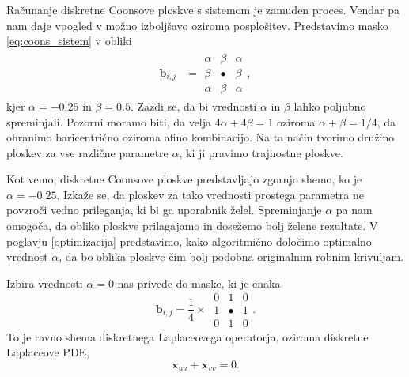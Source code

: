 \documentclass[twocolumn, 10pt]{article}    %
\begin{document}
Računanje diskretne Coonsove ploskve s sistemom je zamuden proces.
Vendar pa nam daje vpogled v možno izboljšavo oziroma posplošitev.
Predstavimo masko \ref{eq:coons_sistem} v obliki
\begin{align}
    \mathbf{b}_{i,j} &= 
    \begin{matrix}
        \alpha & \beta & \alpha \\
        \beta &  \bullet &  \beta \\
        \alpha& \beta & \alpha
    \end{matrix},
    \label{eq:permanence_sistem}
\end{align}
kjer $\alpha = -0.25$ in $\beta = 0.5$.
Zazdi se, da bi vrednosti $\alpha$ in $\beta$ lahko poljubno spreminjali.
Pozorni moramo biti, da velja $4\alpha + 4\beta = 1$ oziroma $\alpha + \beta = 1/4$, da ohranimo baricentrično oziroma afino kombinacijo.
Na ta način tvorimo družino ploskev za vse različne parametre $\alpha$, ki ji pravimo trajnostne ploskve.

Kot vemo, diskretne Coonsove ploskve predstavljajo zgornjo shemo, ko je $\alpha = -0.25.$
Izkaže se, da ploskev za tako vrednosti prostega parametra ne povzroči vedno prileganja, ki bi ga uporabnik želel.
Spreminjanje $\alpha$ pa nam omogoča, da obliko ploskve prilagajamo in dosežemo bolj želene rezultate. 
V poglavju \ref{optimizacija} predstavimo, kako algoritmično določimo optimalno vrednost $\alpha$, da bo oblika ploskve čim bolj podobna originalnim robnim krivuljam.

Izbira vrednosti $\alpha = 0$ nas privede do maske, ki je enaka
\begin{equation}
    \mathbf{b}_{i,j} = \frac{1}{4} \times \ \begin{matrix}
            0 & 1 & 0 \\ 1 & \bullet & 1 \\ 0 & 1 & 0
        \end{matrix}.
\end{equation}
To je ravno shema diskretnega Laplaceovega operatorja, oziroma diskretne Laplaceove PDE,
\begin{equation}
    \mathbf{x}_{uu} + \mathbf{x}_{vv} = 0.
\end{equation}
\end{document}
